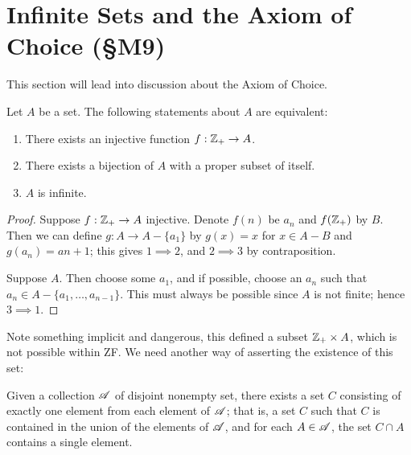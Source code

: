 \documentclass{report}
\begin{document}
\section{Infinite Sets and the Axiom of Choice (\S M9)}
This section will lead into discussion about the Axiom of Choice.
\begin{theorem}
 Let $A$ be a set. The following statements about $A$ are equivalent:
 
 \begin{enumerate}[label={(\arabic*)}]
    \item There exists an injective function $f:\mathbb{Z}_+ \rightarrow A$.
    \item There exists a bijection of $A$ with a proper subset of itself.
    \item $A$ is infinite.
 \end{enumerate}
\end{theorem}
\begin{proof}
  Suppose $f: \mathbb{Z}_+ \rightarrow A$ injective.
  Denote $f(n)$ be $a_n$ and $f(\mathbb{Z}_+)$ by $B$.
  Then we can define $g:A \rightarrow A - \{a_1\}$ by $g(x) = x$ for $x \in A - B$ and $g(a_n) = a{n+1}$; this gives $1 \implies 2$, and $2 \implies 3$ by contraposition.

  Suppose $A$.
  Then choose some $a_1$, and if possible, choose an $a_n$ such that $a_n \in A - \{a_1,\dots,a_{n-1}\}$.
  This must always be possible since $A$ is not finite; hence $3 \implies 1$.
\end{proof}

Note something implicit and dangerous, this defined a subset $\mathbb{Z}_+ \times A$, which is not possible within ZF. We need another way of asserting the existence of this set:

\begin{axiom}
  Given a collection $\mathscr{A}$ of disjoint nonempty set, there exists a set $C$ consisting of exactly one element from each element of $\mathscr{A}$; 
  that is, a set $C$ such that $C$ is contained in the union of the elements of $\mathscr{A}$, and for each $A \in \mathscr{A}$, the set $C \cap A$ contains a single element.
\end{axiom}
\end{document}
